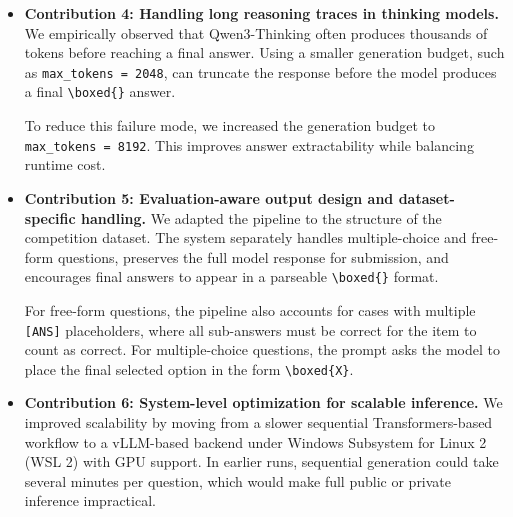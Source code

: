 \documentclass{article}
\begin{document}
\begin{itemize}
Uncertainty is detected using signals such as:
\begin{itemize}
    \item Truncated outputs (\texttt{finish\_reason = length})
    \item Missing \texttt{\textbackslash boxed\{\}} answers
    \item Weak agreement across multiple samples
\end{itemize}

This approach avoids the high cost of applying full self-consistency \cite{wang2022selfconsistency} to all problems while improving reliability on harder instances.
\item \textbf{Contribution 4: Handling long reasoning traces in thinking models.}
We empirically observed that Qwen3-Thinking \cite{qwen3} often produces thousands of tokens before reaching a final answer. Using a smaller generation budget, such as \texttt{max\_tokens = 2048}, can truncate the response before the model produces a final \texttt{\textbackslash boxed\{\}} answer.

To reduce this failure mode, we increased the generation budget to \texttt{max\_tokens = 8192}. This improves answer extractability while balancing runtime cost.

\item \textbf{Contribution 5: Evaluation-aware output design and dataset-specific handling.}
We adapted the pipeline to the structure of the competition dataset. The system separately handles multiple-choice and free-form questions, preserves the full model response for submission, and encourages final answers to appear in a parseable \texttt{\textbackslash boxed\{\}} format.

For free-form questions, the pipeline also accounts for cases with multiple \texttt{[ANS]} placeholders, where all sub-answers must be correct for the item to count as correct. For multiple-choice questions, the prompt asks the model to place the final selected option in the form \texttt{\textbackslash boxed\{X\}}.

\item \textbf{Contribution 6: System-level optimization for scalable inference.}
We improved scalability by moving from a slower sequential Transformers-based workflow to a vLLM-based \cite{kwon2023vllm} backend under Windows Subsystem for Linux 2 (WSL 2) with GPU support. In earlier runs, sequential generation could take several minutes per question, which would make full public or private inference impractical.


\end{itemize}
\end{document}
